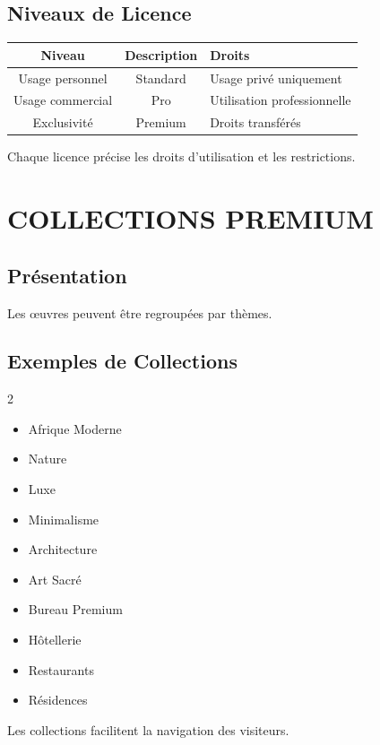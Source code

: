 \documentclass[12pt,a4paper,oneside]{book}
\begin{document}
\section{Niveaux de Licence}
\begin{center}
\begin{tabular}{|c|c|p{8cm}|}
\hline
\rowcolor{electroncyan}
\color{white}\textbf{Niveau} & \color{white}\textbf{Description} & \color{white}\textbf{Droits} \\
\hline
Usage personnel & Standard & Usage privé uniquement \\
\hline
Usage commercial & Pro & Utilisation professionnelle \\
\hline
Exclusivité & Premium & Droits transférés \\
\hline
\end{tabular}
\end{center}

Chaque licence précise les droits d'utilisation et les restrictions.

\chapter{COLLECTIONS PREMIUM}

\section{Présentation}
Les œuvres peuvent être regroupées par thèmes.

\section{Exemples de Collections}
\begin{multicols}{2}
\begin{itemize}
\item Afrique Moderne
\item Nature
\item Luxe
\item Minimalisme
\item Architecture
\item Art Sacré
\item Bureau Premium
\item Hôtellerie
\item Restaurants
\item Résidences
\end{itemize}
\end{multicols}

Les collections facilitent la navigation des visiteurs.
\end{document}
